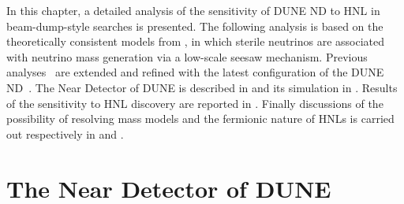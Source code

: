 In this chapter, a detailed analysis of the sensitivity of DUNE ND to HNL in beam-dump-style searches is presented.
The following analysis is based on the theoretically consistent models from , %
in which sterile neutrinos are associated with neutrino mass generation via a low-scale seesaw mechanism.
Previous analyses~\cite{Krasnov:2019kdc, Adams:2013qkq} are extended and refined
with the latest configuration of the DUNE ND~\cite{Abi:2020wmh}.
The Near Detector of DUNE is described in  and its simulation in .
Results of the sensitivity to HNL discovery are reported in .
Finally discussions of the possibility of resolving mass models and the fermionic nature of HNLs is %
carried out respectively in  and .


\section{The Near Detector of DUNE}
\label{sec:dunend}

